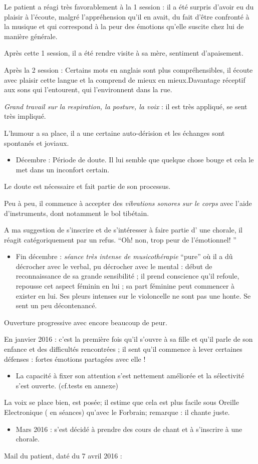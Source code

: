 \documentclass[12pt,french]{report}
\begin{document}
Le patient a réagi très favorablement à la 1\textdegree{} session
: il a été surpris d'avoir eu du plaisir à l'écoute, malgré l'appréhension
qu'il en avait, du fait d'être confronté à la musique et qui correspond
à la peur des émotions qu'elle suscite chez lui de manière générale.

Après cette 1\textdegree{} session, il a été rendre visite à sa mère,
sentiment d'apaisement.

Après la 2\textdegree{} session : Certains mots en anglais sont plus
compréhensibles, il écoute avec plaisir cette langue et la comprend
de mieux en mieux.Davantage réceptif aux sons qui l'entourent, qui
l'environnent dans la rue.

\emph{Grand travail sur la respiration, la posture, la voix }: il
est très appliqué, se sent très impliqué. 

L'humour a sa place, il a une certaine auto-dérision et les échanges
sont spontanés et joviaux.
\begin{itemize}
\item Décembre : Période de doute. Il lui semble que quelque chose bouge
et cela le met dans un inconfort certain.
\end{itemize}
Le doute est nécessaire et fait partie de son processus.

Peu à peu, il commence à accepter des\emph{ vibrations sonores sur
le corps} avec l'aide d'instruments, dont notamment le bol tibétain.

A ma suggestion de s'inscrire et de s'intéresser à faire partie d'
une chorale, il réagit catégoriquement par un refus. ``Oh! non, trop
peur de l'émotionnel! ''
\begin{itemize}
\item Fin décembre : \emph{séance très intense de musicothérapie }``pure''
où il a dû décrocher avec le verbal, pu décrocher avec le mental :
début de reconnaissance de sa grande sensibilité ; il prend conscience
qu'il refoule, repousse cet aspect féminin en lui ; sa part féminine
peut commencer à exister en lui. Ses pleurs intenses sur le violoncelle
ne sont pas une honte. Se sent un peu décontenancé.
\end{itemize}
Ouverture progressive avec encore beaucoup de peur.

En janvier 2016 : c'est la première fois qu'il s'ouvre à sa fille
et qu'il parle de son enfance et des difficultés rencontrées ; il
sent qu'il commence à lever certaines défenses : fortes émotions partagées
avec elle !
\begin{itemize}
\item La capacité à fixer son attention s'est nettement améliorée et la
sélectivité s'est ouverte. (cf.tests en annexe)
\end{itemize}
La voix se place bien, est posée; il estime que cela est plus facile
sous Oreille Electronique ( en séances) qu'avec le Forbrain; remarque
: il chante juste.
\begin{itemize}
\item Mars 2016 : s'est décidé à prendre des cours de chant et à s'inscrire
à une chorale.
\end{itemize}
Mail du patient, daté du 7 avril 2016 :
\end{document}
